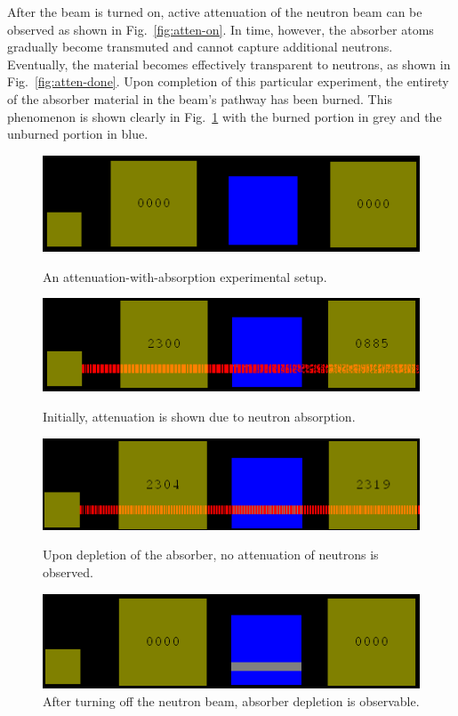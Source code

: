 \documentclass{anstrans}
\newcommand{\Fig}{Fig.~}
\begin{document}
After the beam is turned on, active attenuation of the neutron beam can be
observed as shown in \Fig \ref{fig:atten-on}. In time, however, the absorber
atoms gradually become transmuted and cannot capture additional neutrons.
Eventually, the material becomes effectively transparent to neutrons, as shown
in \Fig \ref{fig:atten-done}. Upon completion of this particular experiment,
the entirety of the absorber material in the beam's pathway has been burned.
This phenomenon is shown clearly in \Fig \ref{fig:atten-off} with the burned
portion in grey and the unburned portion in blue.

\begin{figure}[hb]
    \centering
    \includegraphics[width=\columnwidth]{atten-setup.png}
    \caption{An attenuation-with-absorption experimental setup.}
    \label{fig:atten-setup}
    \vspace{3mm}
    \centering
    \includegraphics[width=\columnwidth]{atten-on.png}
    \caption{Initially, attenuation is shown due to neutron absorption.}
    \label{fig:atten-on}
    \vspace{3mm}
    \centering
    \includegraphics[width=\columnwidth]{atten-done.png}
    \caption{Upon depletion of the absorber, no attenuation of neutrons is observed.}
    \label{fig:atten-done}
    \vspace{3mm}
    \centering
    \includegraphics[width=\columnwidth]{atten-off.png}
    \caption{After turning off the neutron beam, absorber depletion is observable.}
    \label{fig:atten-off}
\end{figure}
\end{document}

